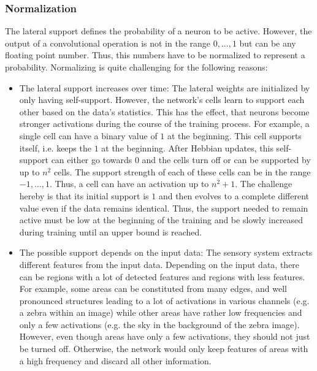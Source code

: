 \subsubsection{Normalization}
The lateral support defines the probability of a neuron to be active. However, the output of a convolutional operation is not in the range $0, ..., 1$ but can be any floating point number. Thus, this numbers have to be normalized to represent a probability.
Normalizing is quite challenging for the following reasons:
\begin{itemize}
	\item The lateral support increases over time: The lateral weights are initialized by only having self-support. However, the network's cells learn to support each other based on the data's statistics. This has the effect, that neurons become stronger activations during the course of the training process. For example, a single cell can have a binary value of $1$ at the beginning. This cell supports itself, i.e. keeps the $1$ at the beginning. After Hebbian updates, this self-support can either go towards $0$ and the cells turn off or can be supported by up to $n^2$ cells. The support strength of each of these cells can be in the range $-1, ..., 1$. Thus, a cell can have an activation up to $n^2+1$. The challenge hereby is that its initial support is $1$ and then evolves to a complete different value even if the data remains identical. Thus, the support needed to remain active must be low at the beginning of the training and be slowly increased during training until an upper bound is reached.
	\item The possible support depends on the input data: The sensory system extracts different features from the input data. Depending on the input data, there can be regions with a lot of detected features and regions with less features. For example, some areas can be constituted from many edges, and well pronounced structures leading to a lot of activations in various channels (e.g. a zebra within an image) while other areas have rather low frequencies and only a few activations (e.g. the sky in the background of the zebra image). However, even though areas have only a few activations, they should not just be turned off. Otherwise, the network would only keep features of areas with a high frequency and discard all other information.
\end{itemize}

